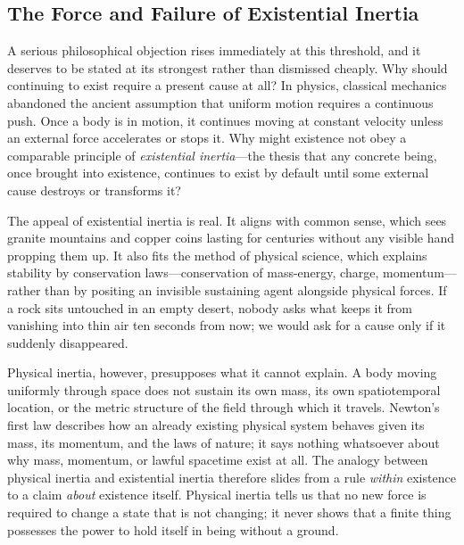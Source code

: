 \subsection{The Force and Failure of Existential Inertia}

A serious philosophical objection rises immediately at this threshold, and it deserves to be stated at its strongest rather than dismissed cheaply. Why should continuing to exist require a present cause at all? In physics, classical mechanics abandoned the ancient assumption that uniform motion requires a continuous push. Once a body is in motion, it continues moving at constant velocity unless an external force accelerates or stops it. Why might existence not obey a comparable principle of \emph{existential inertia}---the thesis that any concrete being, once brought into existence, continues to exist by default until some external cause destroys or transforms it?

The appeal of existential inertia is real. It aligns with common sense, which sees granite mountains and copper coins lasting for centuries without any visible hand propping them up. It also fits the method of physical science, which explains stability by conservation laws---conservation of mass-energy, charge, momentum---rather than by positing an invisible sustaining agent alongside physical forces. If a rock sits untouched in an empty desert, nobody asks what keeps it from vanishing into thin air ten seconds from now; we would ask for a cause only if it suddenly disappeared.

Physical inertia, however, presupposes what it cannot explain. A body moving uniformly through space does not sustain its own mass, its own spatiotemporal location, or the metric structure of the field through which it travels. Newton's first law describes how an already existing physical system behaves given its mass, its momentum, and the laws of nature; it says nothing whatsoever about why mass, momentum, or lawful spacetime exist at all. The analogy between physical inertia and existential inertia therefore slides from a rule \emph{within} existence to a claim \emph{about} existence itself. Physical inertia tells us that no new force is required to change a state that is not changing; it never shows that a finite thing possesses the power to hold itself in being without a ground.

